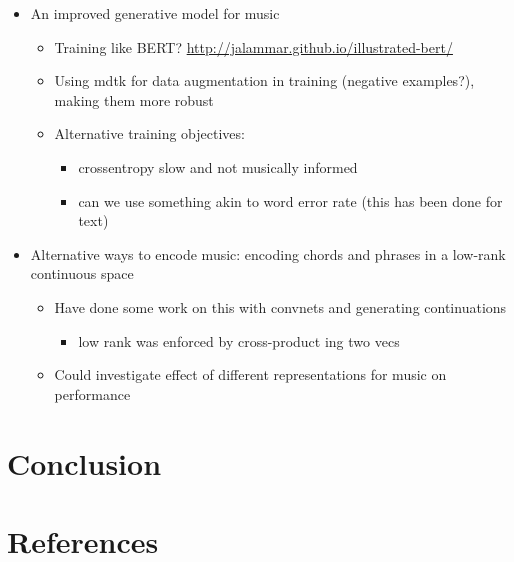 \documentclass[12pt,a4paper,]{report}
\providecommand{\tightlist}{%
  \setlength{\itemsep}{0pt}\setlength{\parskip}{0pt}}
\begin{document}
\begin{itemize}
\tightlist
\item
  An improved generative model for music

  \begin{itemize}
  \tightlist
  \item
    Training like BERT?
    \url{http://jalammar.github.io/illustrated-bert/}
  \item
    Using mdtk for data augmentation in training (negative examples?),
    making them more robust
  \item
    Alternative training objectives:

    \begin{itemize}
    \tightlist
    \item
      crossentropy slow and not musically informed
    \item
      can we use something akin to word error rate (this has been done
      for text)
    \end{itemize}
  \end{itemize}
\item
  Alternative ways to encode music: encoding chords and phrases in a
  low-rank continuous space

  \begin{itemize}
  \tightlist
  \item
    Have done some work on this with convnets and generating
    continuations

    \begin{itemize}
    \tightlist
    \item
      low rank was enforced by cross-product ing two vecs
    \end{itemize}
  \item
    Could investigate effect of different representations for music on
    performance
  \end{itemize}
\end{itemize}

\hypertarget{conclusion}{%
\chapter{Conclusion}\label{conclusion}}

\footnotesize
\singlespacing
\setlength{\parindent}{0in}

\hypertarget{references}{%
\chapter{References}\label{references}}
\end{document}

